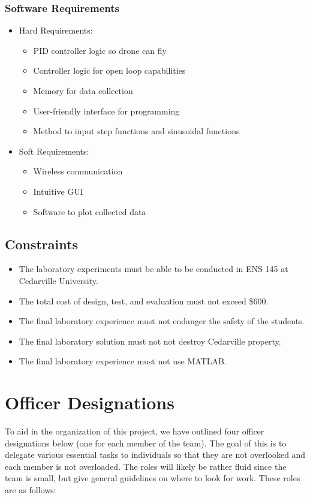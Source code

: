 \documentclass[12pt, titlepage]{article}
\begin{document}
\subsubsection{Software Requirements}
\begin{itemize}
  \item[$\Rightarrow$] Hard Requirements:
  \begin{itemize}
    \item PID controller logic so drone can fly
    \item Controller logic for open loop capabilities
    \item Memory for data collection
    \item User-friendly interface for programming
    \item Method to input step functions and sinusoidal functions
  \end{itemize}
  \item[$\Rightarrow$] Soft Requirements:
  \begin{itemize}
    \item Wireless communication
    \item Intuitive GUI
    \item Software to plot collected data
  \end{itemize}
\end{itemize}
\subsection{Constraints}
\begin{itemize}
  \item The laboratory experiments must be able to be conducted in ENS 145 at Cedarville University.
  \item The total cost of design, test, and evaluation must not exceed \$600.
  \item The final laboratory experience must not endanger the safety of the students.
  \item The final laboratory solution must not not destroy Cedarville property.
  \item The final laboratory experience must not use MATLAB.
\end{itemize}

\section{Officer Designations}
To aid in the organization of this project, we have outlined four officer designations below (one for each member of the team). The goal of this is to delegate various essential tasks to individuals so that they are not overlooked and each member is not overloaded. The roles will likely be rather fluid since the team is small, but give general guidelines on where to look for work. These roles are as follows: \\
\end{document}
